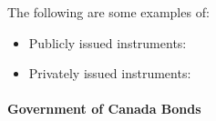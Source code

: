 \documentclass[notoc,notitlepage]{tufte-book}
\begin{document}
\begin{eg}
  The following are some examples of:
  \begin{itemize}
    \item Publicly issued instruments:
    \item Privately issued instruments:
  \end{itemize}
\end{eg}

\paragraph{Government of Canada Bonds}\label{para:government_of_canada_bonds}
\end{document}
